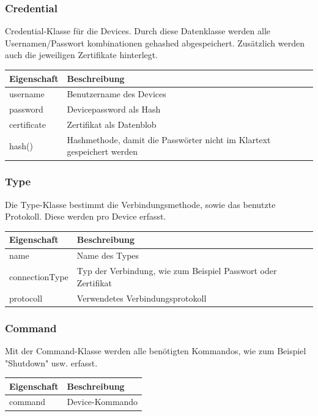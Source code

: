 \subsubsection{Credential}
Credential-Klasse für die Devices. Durch diese Datenklasse werden alle Usernamen/Passwort kombinationen gehashed abgespeichert. Zusätzlich werden auch die jeweiligen Zertifikate hinterlegt.
\begin{table}[H]
\centering
    \begin{tabular}{@{}l p{14.1cm} @{}}\toprule    
    {Eigenschaft} & {Beschreibung}\\ \midrule      
    username & Benutzername des Devices \\
    password & Devicepassword als Hash\\
    certificate & Zertifikat als Datenblob\\
    hash() & Hashmethode, damit die Passwörter nicht im Klartext gespeichert werden\\
    \bottomrule
    \end{tabular}
\end{table}

\subsubsection{Type}
Die Type-Klasse bestimmt die Verbindungsmethode, sowie das benutzte Protokoll. Diese werden pro Device erfasst.
\begin{table}[H]
\centering
    \begin{tabular}{@{}l p{14.1cm} @{}}\toprule    
    {Eigenschaft} & {Beschreibung}\\ \midrule      
    name & Name des Types \\
    connectionType & Typ der Verbindung, wie zum Beispiel Passwort oder Zertifikat\\
    protocoll & Verwendetes Verbindungsprotokoll\\
    \bottomrule
    \end{tabular}
\end{table}

\subsubsection{Command}
Mit der Command-Klasse werden alle benötigten Kommandos, wie zum Beispiel "Shutdown" usw. erfasst.
\begin{table}[H]
\centering
    \begin{tabular}{@{}l p{14.1cm} @{}}\toprule    
    {Eigenschaft} & {Beschreibung}\\ \midrule      
    command & Device-Kommando\\
    \bottomrule
    \end{tabular}
\end{table}


